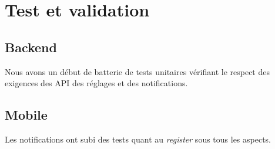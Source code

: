 \def \imageWidth {0.14}

\section{Test et validation}
	\subsection{Backend}
	Nous avons un début de batterie de tests unitaires vérifiant le respect des exigences des API des réglages et des notifications.
	
	\subsection{Mobile}
	Les notifications ont subi des tests quant au \emph{register} sous tous les aspects.